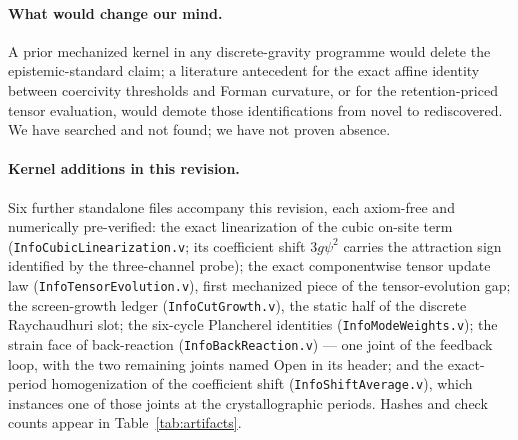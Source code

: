 \documentclass[10pt,twocolumn]{article}
\theoremstyle{definition}
\newcommand{\code}[1]{\texttt{#1}}
\begin{document}
\paragraph{What would change our mind.} A prior mechanized kernel in any
discrete-gravity programme would delete the epistemic-standard claim; a literature
antecedent for the exact affine identity between coercivity thresholds and Forman
curvature, or for the retention-priced tensor evaluation, would demote those
identifications from novel to rediscovered. We have searched and not found; we have
not proven absence.

\paragraph*{Kernel additions in this revision.} Six further standalone files
accompany this revision, each axiom-free and numerically pre-verified: the exact
linearization of the cubic on-site term (\code{InfoCubicLinearization.v}; its
coefficient shift $3g\psi^2$ carries the attraction sign identified by the
three-channel probe); the exact componentwise tensor update law
(\code{InfoTensorEvolution.v}), first mechanized piece of the tensor-evolution
gap; the screen-growth ledger (\code{InfoCutGrowth.v}), the static half of the
discrete Raychaudhuri slot; the six-cycle Plancherel identities
(\code{InfoModeWeights.v}); the strain face of back-reaction
(\code{InfoBackReaction.v}) --- one joint of the feedback loop, with the two
remaining joints named Open in its header; and the exact-period homogenization
of the coefficient shift (\code{InfoShiftAverage.v}), which instances one of
those joints at the crystallographic periods. Hashes and check counts appear in
Table~\ref{tab:artifacts}.
\end{document}
